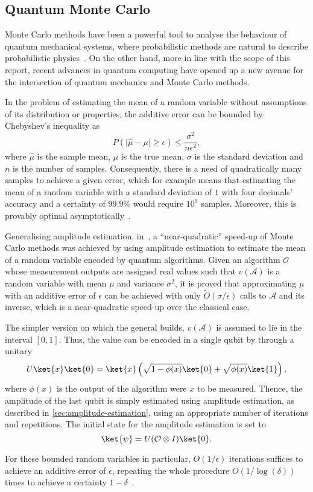 \subsection{Quantum Monte Carlo}
\label{sec:qmc}
Monte Carlo methods have been a powerful tool to analyse the behaviour of quantum mechanical systems, where probabilistic methods are natural to describe probabilistic physics~\autocite{ceperley1986, austin2012,gubernatis2016}.
On the other hand, more in line with the scope of this report, recent advances in quantum computing have opened up a new avenue for the intersection of quantum mechanics and Monte Carlo methods.

In the problem of estimating the mean of a random variable without assumptions of its distribution or properties, the additive error can be bounded by Chebyshev's inequality as
\begin{equation}
    P(\lvert \hat\mu - \mu \rvert \geq \epsilon) \leq \frac{\sigma^2}{n \epsilon^2},
\end{equation}
where $\hat\mu$ is the sample mean, $\mu$ is the true mean, $\sigma$ is the standard deviation and $n$ is the number of samples.
Consequently, there is a need of quadratically many samples to achieve a given error, which for example means that estimating the mean of a random variable with a standard deviation of $1$ with four decimals' accuracy and a certainty of $99.9\%$ would require $10^9$ samples.
Moreover, this is provably optimal asymptotically~\autocite{dagum2000}.

Generalising amplitude estimation, in~\autocite{montanaro2015}, a \enquote{near-quadratic} speed-up of Monte Carlo methods was achieved by using amplitude estimation to estimate the mean of a random variable encoded by quantum algorithms.
Given an algorithm $\mathcal{O}$ whose measurement outputs are assigned real values such that $v(\mathcal{A})$ is a random variable with mean $\mu$ and variance $\sigma^2$, it is proved that approximating $\mu$ with an additive error of $\epsilon$ can be achieved with only $\tilde{O}(\sigma/\epsilon)$ calls to $\mathcal{A}$ and its inverse, which is a near-quadratic speed-up over the classical case\footnotemark{}.


The simpler version on which the general builds, $v(\mathcal{A})$ is assumed to lie in the interval $[0,1]$.
Thus, the value can be encoded in a single qubit by through a unitary
\begin{equation}
    U\ket{x}\ket{0} = \ket{x}\left(\sqrt{1 - \phi(x)}\ket{0} + \sqrt{\phi(x)}\ket{1}\right),
\end{equation}
where $\phi(x)$ is the output of the algorithm were $x$ to be measured.
Thence, the amplitude of the last qubit is simply estimated using amplitude estimation, as described in \cref{sec:amplitude-estimation}, using an appropriate number of iterations and repetitions.
The initial state for the amplitude estimation is set to
\begin{equation}
    \ket{\psi} = U(\mathcal{O} \otimes I)\ket{0}.
\end{equation}

For these bounded random variables in particular, $O(1/\epsilon)$ iterations suffices to achieve an additive error of $\epsilon$, repeating the whole procedure $O(1/\log(\delta))$ times to achieve a certainty $1-\delta$~\autocite{montanaro2015}.
